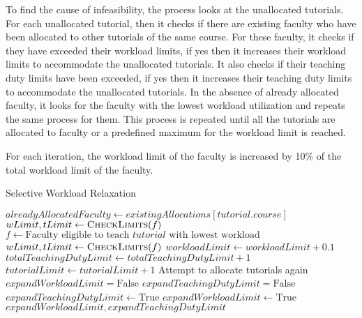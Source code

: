 To find the cause of infeasibility, the process looks at the unallocated tutorials. For each unallocated tutorial, then it checks if there are existing faculty who have been allocated to other tutorials of the same course. For these faculty, it checks if they have exceeded their workload limits, if yes then it increases their workload limits to accommodate the unallocated tutorials. It also checks if their teaching duty limits have been exceeded, if yes then it increases their teaching duty limits to accommodate the unallocated tutorials. In the absence of already allocated faculty, it looks for the faculty with the lowest workload utilization and repeats the same process for them. This process is repeated until all the tutorials are allocated to faculty or a predefined maximum for the workload limit is reached.

For each iteration, the workload limit of the faculty is increased by 10\% of the total workload limit of the faculty.

\begin{algorithm}[H]
  \caption{Selective Workload Relaxation}
  \begin{algorithmic}
    \State $alreadyAllocatedFaculty \gets existingAllocations[tutorial.course]$
    \State $wLimit, tLimit \gets \Call{CheckLimits}{f}$
    \EndFor
    \Else
    \State $f \gets \text{Faculty eligible to teach $tutorial$ with lowest workload}$
    \State $wLimit, tLimit \gets \Call{CheckLimits}{f}$
    \EndIf
    \EndFor
    \State $workloadLimit \gets workloadLimit + 0.1$
    \EndIf
    \State $totalTeachingDutyLimit \gets totalTeachingDutyLimit + 1$
    \State $tutorialLimit \gets tutorialLimit + 1$
    \EndIf
    \State Attempt to allocate tutorials again
    \EndWhile
    \EndProcedure
    \\
    \State $expandWorkloadLimit = \text{False}$
    \State $expandTeachingDutyLimit = \text{False}$
    \State $expandTeachingDutyLimit \gets \text{True}$
    \EndIf
    \State $expandWorkloadLimit \gets \text{True}$
    \EndIf
    \State \Return $expandWorkloadLimit, expandTeachingDutyLimit$
    \EndProcedure
  \end{algorithmic}
\end{algorithm}

